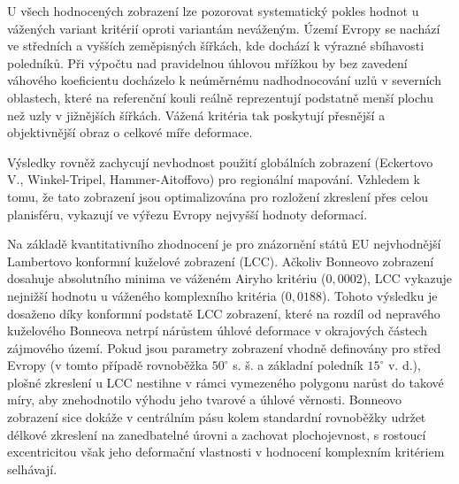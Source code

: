 \documentclass[12pt]{article}
\begin{document}
\newpage
\begin{table}[h!]
\caption{Výsledné hodnoty variačních kritérií}
\end{table}

U všech hodnocených zobrazení lze pozorovat systematický pokles hodnot u vážených variant kritérií oproti variantám neváženým. Území Evropy se nachází ve středních a vyšších zeměpisných šířkách, kde dochází k výrazné sbíhavosti poledníků. Při výpočtu nad pravidelnou úhlovou mřížkou by bez zavedení váhového koeficientu docházelo k neúměrnému nadhodnocování uzlů v severních oblastech, které na referenční kouli reálně reprezentují podstatně menší plochu než uzly v jižnějších šířkách. Vážená kritéria tak poskytují přesnější a objektivnější obraz o celkové míře deformace.

Výsledky rovněž zachycují nevhodnost použití globálních zobrazení (Eckertovo V., Winkel-Tripel, Hammer-Aitoffovo) pro regionální mapování. Vzhledem k tomu, že tato zobrazení jsou optimalizována pro rozložení zkreslení přes celou planisféru, vykazují ve výřezu Evropy nejvyšší hodnoty deformací.

Na základě kvantitativního zhodnocení je pro znázornění států EU nejvhodnější Lambertovo konformní kuželové zobrazení (LCC). Ačkoliv Bonneovo zobrazení dosahuje absolutního minima ve váženém Airyho kritériu ($0,0002$), LCC vykazuje nejnižší hodnotu u váženého komplexního kritéria ($0,0188$). Tohoto výsledku je dosaženo díky konformní podstatě LCC zobrazení, které na rozdíl od nepravého kuželového Bonneova netrpí nárůstem úhlové deformace v okrajových částech zájmového území. Pokud jsou parametry zobrazení vhodně definovány pro střed Evropy (v tomto případě rovnoběžka $50^\circ$ s. š. a základní poledník $15^\circ$ v. d.), plošné zkreslení u LCC nestihne v rámci vymezeného polygonu narůst do takové míry, aby znehodnotilo výhodu jeho tvarové a úhlové věrnosti. Bonneovo zobrazení sice dokáže v centrálním pásu kolem standardní rovnoběžky udržet délkové zkreslení na zanedbatelné úrovni a zachovat plochojevnost, s rostoucí excentricitou však jeho deformační vlastnosti v hodnocení komplexním kritériem selhávají.
\end{document}
